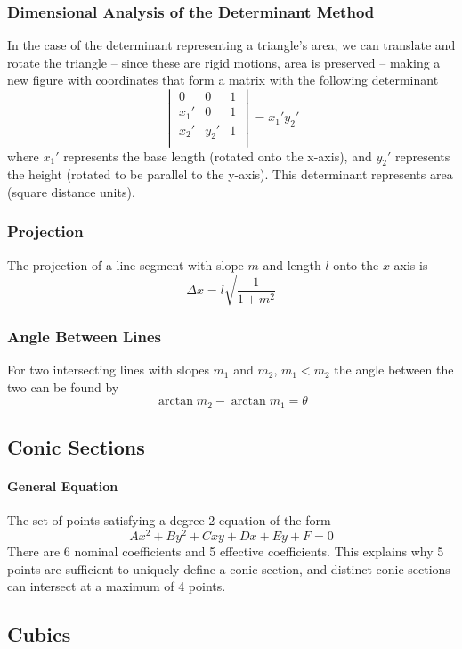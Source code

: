 \documentclass{article}
\begin{document}
\subsubsection{Dimensional Analysis of the Determinant Method}
In the case of the determinant representing a triangle's area, we can translate and rotate the triangle -- since these are rigid motions, area is preserved -- making a new figure with coordinates that form a matrix with the following determinant
$$\begin{vmatrix}
    0 & 0 & 1 \\
    x_1' & 0 & 1 \\
    x_2' & y_2' & 1 \\
\end{vmatrix} = x_1'y_2'$$
where $x_1'$ represents the base length (rotated onto the x-axis), and $y_2'$ represents the height (rotated to be parallel to the y-axis). This determinant represents area (square distance units).


\subsubsection{Projection}
The projection of a line segment with slope $m$ and length $l$ onto the $x$-axis is
$$\Delta x = l\sqrt{\frac{1}{1+m^2}}$$

\subsubsection{Angle Between Lines}
For two intersecting lines with slopes $m_1$ and $m_2$, $m_1 < m_2$ the angle between the two can be found by $$\arctan{m_2} - \arctan{m_1} = \theta$$

\subsection{Conic Sections}

\paragraph{General Equation} The set of points satisfying a degree 2 equation of the form $$Ax^2+By^2 + Cxy + Dx + Ey + F =0$$
There are 6 nominal coefficients and 5 effective coefficients. This explains why 5 points are sufficient to uniquely define a conic section, and distinct conic sections can intersect at a maximum of 4 points.

\subsection{Cubics}
\end{document}
